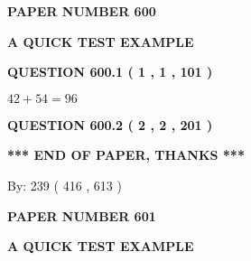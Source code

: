 \documentclass[12pt]{article}
\begin{document}
   
 {\textbf{ \Large{ PAPER NUMBER  600  }}}
   
   
\vspace{0.2in}
   
   
   
   
   
   
 \vspace{0.2in}
{\LARGE {\textbf{ A QUICK TEST EXAMPLE}}}
   
   
  
\vspace{0.2in}
  
{\textbf{\Large{QUESTION
600.1 
 ( 1 , 1 , 101 )
}}}
  
  
 
 

$ %
42 +  %
54=   %
96$
 
 
  
\vspace{0.2in}
  
{\textbf{\Large{QUESTION
600.2 
 ( 2 , 2 , 201 )
}}}
  
  
   
   
 \vspace{0.2in}
 
   
   
   
   
\vspace{1.0in} 
{\textbf{\large{ *** END OF PAPER, THANKS *** }}} 
   
   
\hspace{1.0in} By: 
 239 ( 416 ,  613 )
   
   
   
   
\newpage 
\setcounter{page}{ 
   601001 } 
   
   
   
   
 {\textbf{ \Large{ PAPER NUMBER  601  }}}
   
   
\vspace{0.2in}
   
   
   
   
   
   
 \vspace{0.2in}
{\LARGE {\textbf{ A QUICK TEST EXAMPLE}}}
   
   
  
\vspace{0.2in}
  
\end{document}
